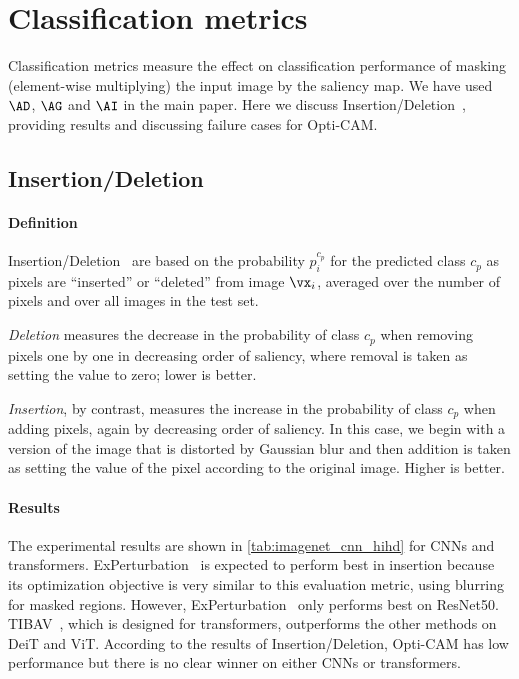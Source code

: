 
\section{Classification metrics}
\label{sec:cla-metrics}

Classification metrics measure the effect on classification performance of masking (element-wise multiplying) the input image by the saliency map. We have used $\AD$, $\AG$ and $\AI$ in the main paper. Here we discuss Insertion/Deletion~\citep{petsiuk2018rise}, providing results and discussing failure cases for Opti-CAM.

\subsection{Insertion/Deletion}

\paragraph{Definition}

Insertion/Deletion~\citep{petsiuk2018rise} are based on the probability $p^{c_p}_i$ for the predicted class $c_p$ as pixels are ``inserted'' or ``deleted'' from image $\vx_i$, averaged over the number of pixels and over all images in the test set.

\emph{Deletion} measures the decrease in the probability of class $c_p$ when removing pixels one by one in decreasing order of saliency, where removal is taken as setting the value to zero; lower is better.

\emph{Insertion}, by contrast, measures the increase in the probability of class $c_p$ when adding pixels, again by decreasing order of saliency. In this case, we begin with a version of the image that is distorted by Gaussian blur and then addition is taken as setting the value of the pixel according to the original image. Higher is better.

\paragraph{Results}

The experimental results are shown in \autoref{tab:imagenet_cnn_hihd} for CNNs and transformers. ExPerturbation~\citep{fong2019understanding} is expected to perform best in insertion because its optimization objective is very similar to this evaluation metric, using blurring for masked regions. However, ExPerturbation~\citep{fong2019understanding}  only performs best on ResNet50. TIBAV~\cite{chefer2021transformer}, which is designed for transformers, outperforms the other methods on DeiT and ViT. According to the results of Insertion/Deletion, Opti-CAM has low performance but there is no clear winner on either CNNs or transformers.

